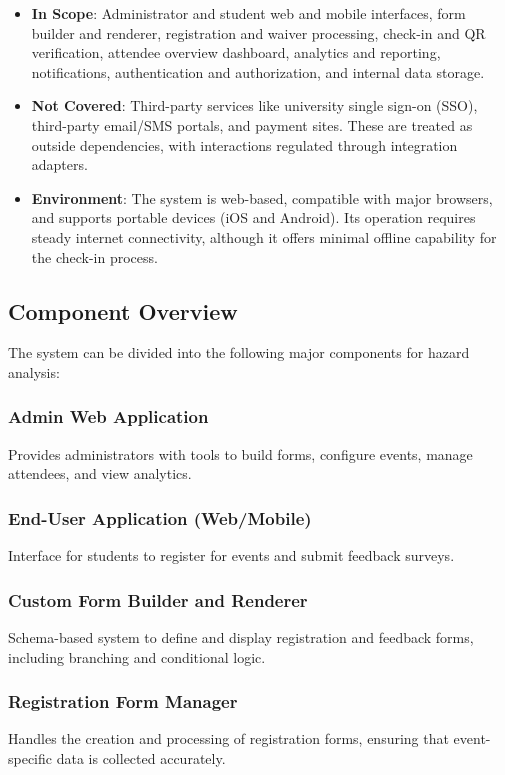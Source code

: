 \documentclass[12pt]{article}
\begin{document}
\begin{itemize}
    \item \textbf{In Scope}: Administrator and student web and mobile interfaces,
    form builder and renderer, registration and waiver processing, check-in and QR verification,
    attendee overview dashboard, analytics and reporting, notifications, authentication and authorization,
    and internal data storage.

    \item \textbf{Not Covered}: Third-party services like university single sign-on (SSO),
    third-party email/SMS portals, and payment sites. These are treated as outside dependencies,
    with interactions regulated through integration adapters.

    \item \textbf{Environment}: The system is web-based, compatible with major browsers,
    and supports portable devices (iOS and Android). Its operation requires steady internet connectivity,
    although it offers minimal offline capability for the check-in process.
\end{itemize}

\subsection{Component Overview}

The system can be divided into the following major components for hazard analysis:

\subsubsection{Admin Web Application}
Provides administrators with tools to build forms, configure events, manage attendees, and view analytics.

\subsubsection{End-User Application (Web/Mobile)}
Interface for students to register for events and submit feedback surveys.

\subsubsection{Custom Form Builder and Renderer}
Schema-based system to define and display registration and feedback forms, including branching and conditional logic.

\subsubsection{Registration Form Manager}
Handles the creation and processing of registration forms, ensuring that event-specific data is collected accurately.
\end{document}
